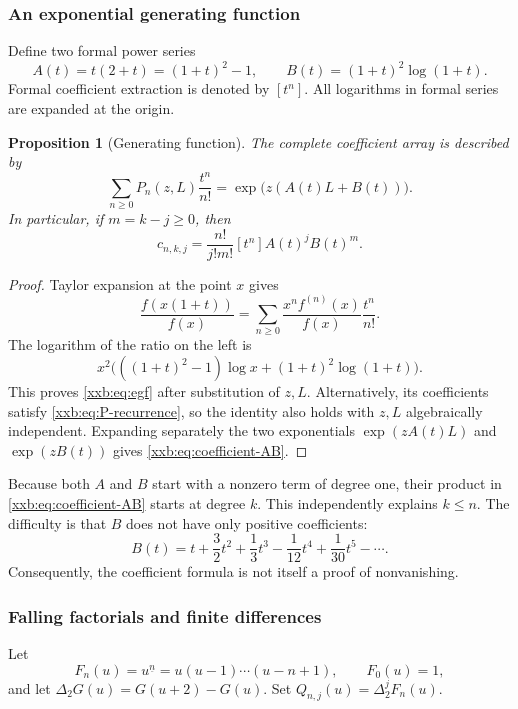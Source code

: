 \documentclass[11pt,a4paper]{article}
\numberwithin{equation}{section}
\newtheorem{proposition}[theorem]{Proposition}
\theoremstyle{definition}
\theoremstyle{remark}
\theoremstyle{plain}
\newcommand{\fall}[2]{#1^{\underline{#2}}}
\begin{document}
\subsubsection{An exponential generating function}
Define two formal power series
\begin{equation}\label{xxb:eq:AB}
 A(t)=t(2+t)=(1+t)^2-1,\qquad
 B(t)=(1+t)^2\log(1+t).
\end{equation}
Formal coefficient extraction is denoted by $[t^n]$. All logarithms in
formal series are expanded at the origin.

\begin{proposition}[Generating function]\label{xxb:prop:egf}
The complete coefficient array is described by
\begin{equation}\label{xxb:eq:egf}
 \sum_{n\ge0}P_n(z,L)\frac{t^n}{n!}
   =\exp\bigl(z(A(t)L+B(t))\bigr).
\end{equation}
In particular, if $m=k-j\ge0$, then
\begin{equation}\label{xxb:eq:coefficient-AB}
 \boxed{\quad
 c_{n,k,j}=\frac{n!}{j!m!}[t^n]A(t)^j B(t)^m.
 \quad}
\end{equation}
\end{proposition}
\begin{proof}
Taylor expansion at the point $x$ gives
\[
 \frac{f(x(1+t))}{f(x)}
 =\sum_{n\ge0}\frac{x^nf^{(n)}(x)}{f(x)}\frac{t^n}{n!}.
\]
The logarithm of the ratio on the left is
\[
 x^2\bigl(((1+t)^2-1)\log x+(1+t)^2\log(1+t)\bigr).
\]
This proves \eqref{xxb:eq:egf} after substitution of $z,L$. Alternatively,
its coefficients satisfy \eqref{xxb:eq:P-recurrence}, so the identity also
holds with $z,L$ algebraically independent. Expanding separately the two
exponentials $\exp(zA(t)L)$ and $\exp(zB(t))$ gives
\eqref{xxb:eq:coefficient-AB}.
\end{proof}

Because both $A$ and $B$ start with a nonzero term of degree one, their
product in \eqref{xxb:eq:coefficient-AB} starts at degree $k$. This independently
explains $k\le n$. The difficulty is that $B$ does not have only positive
coefficients:
\[
 B(t)=t+\frac32t^2+\frac13t^3-\frac1{12}t^4+\frac1{30}t^5-\cdots.
\]
Consequently, the coefficient formula is not itself a proof of
nonvanishing.

\subsubsection{Falling factorials and finite differences}
Let
\[
 F_n(u)=\fall{u}{n}=u(u-1)\cdots(u-n+1),\qquad F_0(u)=1,
\]
and let $\Delta_2G(u)=G(u+2)-G(u)$. Set
$Q_{n,j}(u)=\Delta_2^jF_n(u)$.
\end{document}
